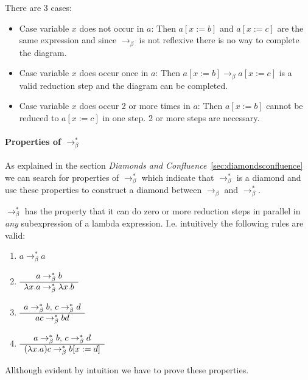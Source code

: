 There are 3 cases:
\begin{itemize}
\item
  Case variable $x$ does not occur in $a$: Then $a[x:=b] $ and $a[x:=c]$
  are the same expression and since $\to_\beta$ is not reflexive there is no
  way to complete the diagram.

\item
  Case variable $x$ does occur once in $a$: Then $a[x:=b] \to_\beta
  a[x:=c]$ is a valid reduction step and the diagram can be completed.

\item
  Case variable $x$ does occur 2 or more times in $a$: Then $a[x:=b]$ cannot
  be reduced to $a[x:=c]$ in one step. 2 or more steps are necessary.
\end{itemize}



\paragraph{Properties of $\to_\beta^*$}
As explained in the section \emph{Diamonds and
  Confluence}~\ref{sec:diamondsconfluence}
we can search for properties of  $\to_\beta^*$ which indicate that
$\to_\beta^*$ is a diamond and use these properties to construct a diamond
between $\to_\beta$ and $\to_\beta^*$.

$\to_\beta^*$ has the property that it can do zero or more reduction steps in
parallel in \emph{any} subexpression of a lambda expression. I.e. intuitively
the following rules are valid:
\begin{enumerate}
\item
  $a \to_\beta^* a$
\item
  $\begin{array}{c} a \to_\beta^* b \\ \hline \lambda x.a \to_\beta^* \lambda x.b\end{array}$
\item
  $\begin{array}{c} a \to_\beta^* b, \, c \to_\beta^* d \\ \hline ac \to_\beta^* bd\end{array}$
\item
  $\begin{array}{c} a \to_\beta^* b, \, c \to_\beta^* d \\ \hline (\lambda x.a) c \to_\beta^* b[x:=d]\end{array} $
\end{enumerate}

Allthough evident by intuition we have to prove these properties.

